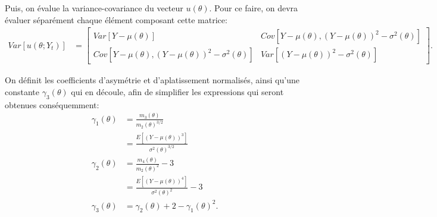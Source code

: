 Puis, on évalue la variance-covariance du vecteur $u(\theta)$. Pour ce
faire, on devra évaluer séparément chaque élément composant cette
matrice:
\begin{align}
  \label{eq:matvcov-u-EE}
  Var\left[u(\theta;Y_t) \right] &=
  \begin{bmatrix}
    Var\left[Y-\mu(\theta)\right] & Cov\left[Y-\mu(\theta),(Y-\mu(\theta))^2-\sigma^2(\theta) \right] \\
    Cov\left[Y-\mu(\theta),(Y-\mu(\theta))^2-\sigma^2(\theta) \right]
    & Var\left[(Y-\mu(\theta))^2-\sigma^2(\theta)\right]
  \end{bmatrix}.
\end{align}

On définit les coefficients d'asymétrie et d'aplatissement normalisés,
ainsi qu'une constante $\gamma_3(\theta)$ qui en découle, afin de
simplifier les expressions qui seront obtenues conséquemment:
\begin{subequations}\label{eq:momentsupgamma}
  \begin{align}
    \gamma_1\left(\theta\right) &= \frac{m_3\left(\theta\right)}{m_2\left(\theta\right)^{3/2}} \nonumber\\
    &= \frac{E\left[\left(Y-\mu\left(\theta\right)\right)^3\right]}{\sigma^2\left(\theta\right)^{3/2}}  \label{eq:momentsupgamma1}\\
    \gamma_2\left(\theta\right) &= \frac{m_4\left(\theta\right)}{m_2\left(\theta\right)^{2}} - 3 \nonumber\\
    &=\frac{E\left[\left(Y-\mu\left(\theta\right)\right)^4\right]}{\sigma^2\left(\theta\right)^2}-3 \label{eq:momentsupgamma2}\\
    \gamma_3(\theta) &= \gamma_2\left(\theta\right) + 2 -
    \gamma_1\left(\theta\right)^2. \label{eq:momentsupgamma3}
  \end{align}
\end{subequations}


